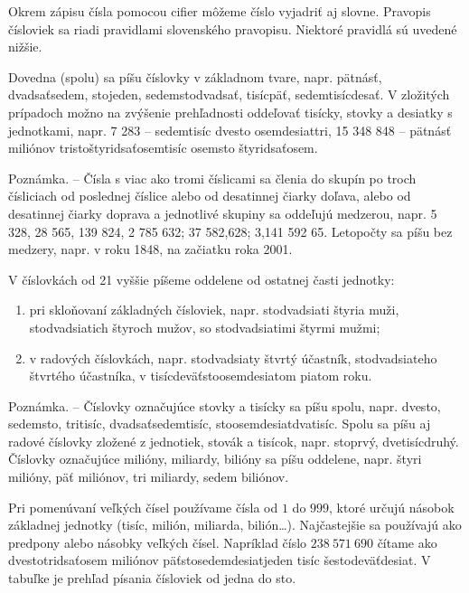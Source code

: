 \documentclass{article}
\begin{document}
Okrem zápisu čísla pomocou cifier môžeme číslo vyjadriť aj slovne. Pravopis čísloviek sa riadi pravidlami slovenského pravopisu. Niektoré pravidlá sú uvedené nižšie.

\begin{displayquote}
  Dovedna (spolu) sa píšu číslovky v základnom tvare, napr. pätnásť, dvadsaťsedem, stojeden, sedemstodvadsať, tisícpäť, sedemtisícdesať. V zložitých prípadoch možno na zvýšenie prehľadnosti oddeľovať tisícky, stovky a desiatky s jednotkami, napr. 7 283 – sedemtisíc dvesto osemdesiattri, 15 348 848 – pätnásť miliónov tristoštyridsaťosemtisíc osemsto štyridsaťosem.

  Poznámka. – Čísla s viac ako tromi číslicami sa členia do skupín po troch čísliciach od poslednej číslice alebo od desatinnej čiarky doľava, alebo od desatinnej čiarky doprava a jednotlivé skupiny sa oddeľujú medzerou, napr. 5 328, 28 565, 139 824, 2 785 632; 37 582,628; 3,141 592 65. Letopočty sa píšu bez medzery, napr. v roku 1848, na začiatku roka 2001.

  V číslovkách od 21 vyššie píšeme oddelene od ostatnej časti jednotky:

  \begin{enumerate}[label=\alph*)]
  \item pri skloňovaní základných čísloviek, napr. stodvadsiati štyria muži, stodvadsiatich štyroch mužov, so stodvadsiatimi štyrmi mužmi;
  \item v radových číslovkách, napr. stodvadsiaty štvrtý účastník, stodvadsiateho štvrtého účastníka, v tisícdeväťstoosemdesiatom piatom roku.
  \end{enumerate}

  Poznámka. – Číslovky označujúce stovky a tisícky sa píšu spolu, napr. dvesto, sedemsto, tritisíc, dvadsaťsedemtisíc, stoosemdesiatdvatisíc. Spolu sa píšu aj radové číslovky zložené z jednotiek, stovák a tisícok, napr. stoprvý, dvetisícdruhý. Číslovky označujúce milióny, miliardy, bilióny sa píšu oddelene, napr. štyri milióny, päť miliónov, tri miliardy, sedem biliónov.\cite{psp2000}
\end{displayquote}

Pri pomenúvaní veľkých čísel používame čísla od \(1\) do \(999\), ktoré určujú násobok základnej jednotky (tisíc, milión, miliarda, bilión\dots). Najčastejšie sa používajú ako predpony alebo násobky veľkých čísel. Napríklad číslo \(238\ 571\ 690\) čítame ako dvestotridsaťosem miliónov päťstosedemdesiatjeden tisíc šestodeväťdesiat. V tabuľke je prehľad písania čísloviek od jedna do sto.
\end{document}
